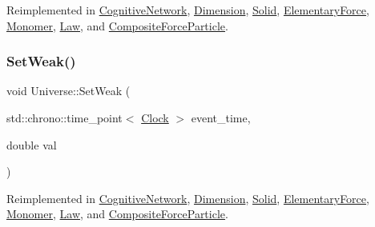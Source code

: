 Reimplemented in \mbox{\hyperlink{classCognitiveNetwork_a6f7210dd8c2786518329faa61b6e14d5}{Cognitive\+Network}}, \mbox{\hyperlink{classDimension_a9bd5480b1da689cd58bf61dac7169080}{Dimension}}, \mbox{\hyperlink{classSolid_a8b80ebe209fcd3afa4791968127753d0}{Solid}}, \mbox{\hyperlink{classElementaryForce_ac25021d38c1d54bf711096ab37a461f6}{Elementary\+Force}}, \mbox{\hyperlink{classMonomer_ae6ca57913da27fa749d33d1c4fed27ca}{Monomer}}, \mbox{\hyperlink{classLaw_ad4a05c77d11ddec40b1e07246cac449d}{Law}}, and \mbox{\hyperlink{classCompositeForceParticle_aeba1070d4ec6e52fd8276e38c6a6c2e1}{Composite\+Force\+Particle}}.

\mbox{\label{classUniverse_a0f5cd04081b41ee931c0557dc397f6fb}} 
\subsubsection{\texorpdfstring{Set\+Weak()}{SetWeak()}}
{\footnotesize\ttfamily void Universe\+::\+Set\+Weak (\begin{DoxyParamCaption}\item[{std\+::chrono\+::time\+\_\+point$<$ \mbox{\hyperlink{universe_8h_a0ef8d951d1ca5ab3cfaf7ab4c7a6fd80}{Clock}} $>$}]{event\+\_\+time,  }\item[{double}]{val }\end{DoxyParamCaption})\hspace{0.3cm}{\ttfamily [virtual]}}



Reimplemented in \mbox{\hyperlink{classCognitiveNetwork_ab39c9eed50da6d3630c4498ae64b804e}{Cognitive\+Network}}, \mbox{\hyperlink{classDimension_a157cfa28dd6bc5518d622d01445ca827}{Dimension}}, \mbox{\hyperlink{classSolid_aa28e0f7e4de2fc0c1e28d385214296bf}{Solid}}, \mbox{\hyperlink{classElementaryForce_a093cdf0810e95f1d973bd9dc88c6788b}{Elementary\+Force}}, \mbox{\hyperlink{classMonomer_ad4fe1db33f493575281e1a2fb35004ca}{Monomer}}, \mbox{\hyperlink{classLaw_a1009b4e0bc0b91f41d48dc137529e97b}{Law}}, and \mbox{\hyperlink{classCompositeForceParticle_a7899a6efda98b062051e37c25c214e2a}{Composite\+Force\+Particle}}.

\mbox{\label{classUniverse_a2d3d642bfdc863248e93535832fa4b00}} 

